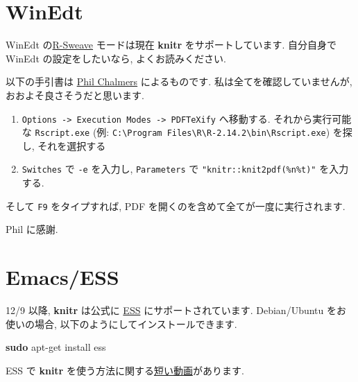 \documentclass[
  lualatex,ja=standard,jafont=noto-otf]{bxjsreport}
\newenvironment{Shaded}{\begin{snugshade}}{\end{snugshade}}
\newcommand{\FunctionTok}[1]{\textcolor[rgb]{0.13,0.29,0.53}{\textbf{#1}}}
\newcommand{\NormalTok}[1]{#1}
\providecommand{\tightlist}{%
  \setlength{\itemsep}{0pt}\setlength{\parskip}{0pt}}
\begin{document}
\hypertarget{winedt}{%
\section*{WinEdt}\label{winedt}}

WinEdt
の\href{http://www.winedt.org/Config/modes/R-Sweave.php}{R-Sweave}
モードは現在 \textbf{knitr} をサポートしています. 自分自身で WinEdt
の設定をしたいなら, よくお読みください.

以下の手引書は \href{https://github.com/philchalmers}{Phil Chalmers}
によるものです. 私は全てを確認していませんが,
おおよそ良さそうだと思います.

\begin{enumerate}
\def\labelenumi{\arabic{enumi}.}
\tightlist
\item
  \texttt{Options\ -\textgreater{}\ Execution\ Modes\ -\textgreater{}\ PDFTeXify}
  へ移動する. それから実行可能な \texttt{Rscript.exe} (例:
  \texttt{C:\textbackslash{}Program\ Files\textbackslash{}R\textbackslash{}R-2.14.2\textbackslash{}bin\textbackslash{}Rscript.exe})
  を探し, それを選択する
\item
  \texttt{Switches} で \texttt{-e} を入力し, \texttt{Parameters} で
  \texttt{"knitr::knit2pdf(\textquotesingle{}\%n\%t\textquotesingle{})"}
  を入力する.
\end{enumerate}

そして \texttt{F9} をタイプすれば, PDF
を開くのを含めて全てが一度に実行されます.

Phil に感謝.

\hypertarget{emacsess}{%
\section*{Emacs/ESS}\label{emacsess}}

12/9 以降, \textbf{knitr} は公式に \href{http://ess.r-project.org}{ESS}
にサポートされています. Debian/Ubuntu をお使いの場合,
以下のようにしてインストールできます.

\begin{Shaded}
\begin{Highlighting}[]
\FunctionTok{sudo}\NormalTok{ apt{-}get install ess}
\end{Highlighting}
\end{Shaded}

ESS で \textbf{knitr}
を使う方法に関する\href{https://web.archive.org/web/20161225094148im_/http://cdn.screenr.com/video/d43075}{短い動画}があります.
\end{document}
